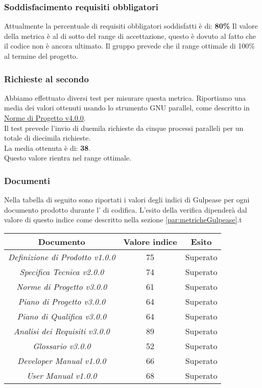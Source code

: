 \documentclass{scalatekids-article}
\begin{document}
\subsubsection{Soddisfacimento requisiti obbligatori}
Attualmente la percentuale di requisiti obbligatori soddisfatti è di: \textbf{80\%}
Il valore della metrica è al di sotto del range di accettazione, questo è dovuto
al fatto che il codice non è ancora ultimato. Il gruppo prevede che il range ottimale
di 100\% al termine del progetto.

\subsubsection{Richieste al secondo}
Abbiamo effettuato diversi test per misurare questa metrica. Riportiamo una media
dei valori ottenuti usando lo strumento GNU parallel, come descritto in 
\href{run:./NormeDiProgetto\_v4.0.0.pdf}{Norme di Progetto v4.0.0}.\\
Il test prevede l'invio di duemila richieste da cinque processi paralleli
per un totale di diecimila richieste.\\
La media ottenuta è di: \textbf{38}.\\
Questo valore rientra nel range ottimale.

\subsubsection{Documenti}
Nella tabella di seguito sono riportati i valori degli indici di Gulpease per ogni documento prodotto durante l' di codifica. L'esito della verifica dipenderà dal valore di questo indice come descritto nella sezione \ref{par:metricheGulpease}.t
\begin{center}
  \begin{tabular}{| c | c | c |}
    \hline
    Documento & Valore indice & Esito\\
    \hline
    \textit{Definizione di Prodotto v1.0.0} & 75 & Superato\\
    \textit{Specifica Tecnica v2.0.0} & 74 & Superato\\
    \textit{Norme di Progetto v3.0.0} & 61 & Superato\\
    \textit{Piano di Progetto v3.0.0} & 64 & Superato\\
    \textit{Piano di Qualifica v3.0.0} & 64 & Superato\\
    \textit{Analisi dei Requisiti v3.0.0} & 89 & Superato\\
    \textit{Glossario v3.0.0} & 52 & Superato\\
    \textit{Developer Manual v1.0.0} & 66 & Superato\\
    \textit{User Manual v1.0.0} & 68 & Superato\\
    \hline
  \end{tabular}
\end{center}
\end{document}
